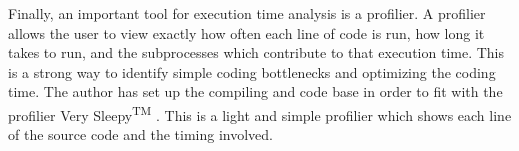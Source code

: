 Finally, an important tool for execution time analysis is a profilier. A profilier allows the user to view exactly how often each line of code is run, how long it takes to run, and the subprocesses which contribute to that execution time. This is a strong way to identify simple coding bottlenecks and optimizing the coding time. The author has set up the compiling and code base in order to fit with the profilier Very Sleepy\textsuperscript{TM} \cite{Sleepy}. This is a light and simple profilier which shows each line of the source code and the timing involved. \par



